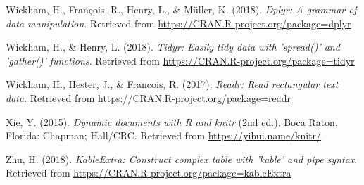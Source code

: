 \documentclass[man,floatsintext]{apa6}
\theoremstyle{definition}
\theoremstyle{definition}
\theoremstyle{definition}
\theoremstyle{remark}
\begin{document}
\leavevmode\hypertarget{ref-R-dplyr}{}%
Wickham, H., François, R., Henry, L., \& Müller, K. (2018). \emph{Dplyr:
A grammar of data manipulation}. Retrieved from
\url{https://CRAN.R-project.org/package=dplyr}

\leavevmode\hypertarget{ref-R-tidyr}{}%
Wickham, H., \& Henry, L. (2018). \emph{Tidyr: Easily tidy data with
'spread()' and 'gather()' functions}. Retrieved from
\url{https://CRAN.R-project.org/package=tidyr}

\leavevmode\hypertarget{ref-R-readr}{}%
Wickham, H., Hester, J., \& Francois, R. (2017). \emph{Readr: Read
rectangular text data}. Retrieved from
\url{https://CRAN.R-project.org/package=readr}

\leavevmode\hypertarget{ref-R-knitr}{}%
Xie, Y. (2015). \emph{Dynamic documents with R and knitr} (2nd ed.).
Boca Raton, Florida: Chapman; Hall/CRC. Retrieved from
\url{https://yihui.name/knitr/}

\leavevmode\hypertarget{ref-R-kableExtra}{}%
Zhu, H. (2018). \emph{KableExtra: Construct complex table with 'kable'
and pipe syntax}. Retrieved from
\url{https://CRAN.R-project.org/package=kableExtra}

\endgroup
\end{document}
